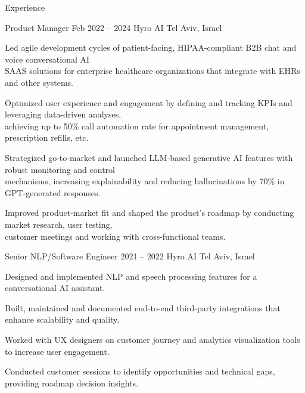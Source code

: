 \documentclass{resume} %
\begin{document}
\begin{rSection}{Experience}

\begin{rSubsection}
	{Product Manager}
	{Feb 2022 -- 2024}
	{Hyro AI}
	{Tel Aviv, Israel}

	\setlength{\itemindent}{.5cm}
	
	
	
	\item Led agile development cycles of patient-facing, HIPAA-compliant B2B chat and voice conversational AI\\\hspace*{.5cm}SAAS solutions for enterprise healthcare organizations that integrate with EHRs and other systems.
	\item Optimized user experience and engagement by defining and tracking KPIs and leveraging data-driven analyses,\\\hspace*{.5cm}achieving up to 50\% call automation rate for appointment management, prescription refills, etc.
	\item Strategized go-to-market and launched LLM-based generative AI features with robust monitoring and control\\\hspace*{.5cm}mechanisms, increasing explainability and reducing hallucinations by 70\% in GPT-generated responses.
	\item Improved product-market fit and shaped the product's roadmap by conducting market research, user testing,\\\hspace*{.5cm}customer meetings and working with cross-functional teams.
\end{rSubsection}

\begin{rSubsection}
	{Senior NLP/Software Engineer}
	{2021 -- 2022}
	{Hyro AI}
	{Tel Aviv, Israel}
	
	\setlength{\itemindent}{.5cm}
	
	\item Designed and implemented NLP and speech processing features for a conversational AI assistant.
	\item Built, maintained and documented end-to-end third-party integrations that enhance scalability and quality.
	\item Worked with UX designers on customer journey and analytics visualization tools to increase user engagement.
	\item Conducted customer sessions to identify opportunities and technical gaps, providing roadmap decision insights.
\end{rSubsection}


\end{rSection}
\end{document}
